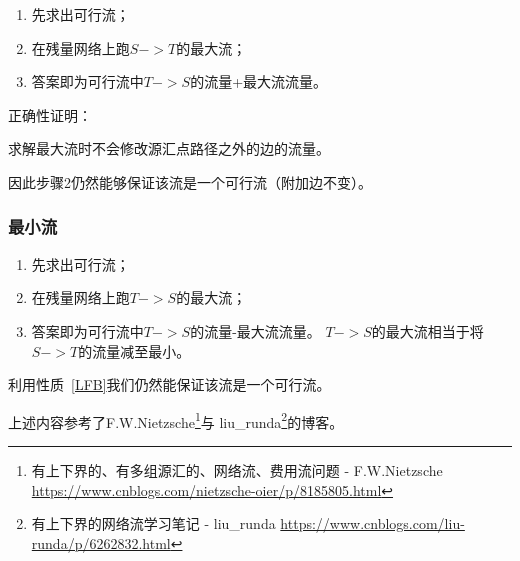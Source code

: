 \begin{enumerate}
    \item 先求出可行流；
    \item 在残量网络上跑$S->T$的最大流；
    \item 答案即为可行流中$T->S$的流量+最大流流量。
\end{enumerate}

正确性证明：

\begin{character}\label{LFB}
    求解最大流时不会修改源汇点路径之外的边的流量。
\end{character}

因此步骤2仍然能够保证该流是一个可行流（附加边不变）。

\subsubsection{最小流}

\begin{enumerate}
    \item 先求出可行流；
    \item 在残量网络上跑$T->S$的最大流；
    \item 答案即为可行流中$T->S$的流量-最大流流量。
    $T->S$的最大流相当于将$S->T$的流量减至最小。
\end{enumerate}

利用性质~\ref{LFB}我们仍然能保证该流是一个可行流。

上述内容参考了F.W.Nietzsche\footnote{有上下界的、有多组源汇的、网络流、费用流问题 - F.W.Nietzsche
\url{https://www.cnblogs.com/nietzsche-oier/p/8185805.html}}与
liu\_runda\footnote{有上下界的网络流学习笔记 - liu\_runda
\url{https://www.cnblogs.com/liu-runda/p/6262832.html}}的博客。
